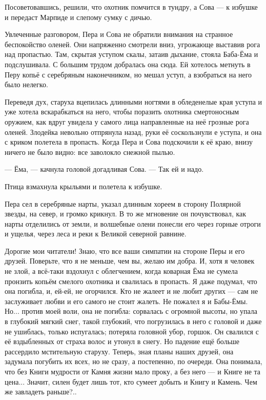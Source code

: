 \documentclass[oneside,final,14pt]{extreport}
\begin{document}
	Посоветовавшись, решили, что охотник помчится в тундру, а Сова — к избушке и передаст Марпиде и слепому сумку с дичью.
	
	Увлеченные разговором, Пера и Сова не обратили внимания на странное беспокойство оленей. Они напряженно смотрели вниз, угрожающе выставив рога над пропастью. Там, скрытая уступом скалы, затаив дыхание, стояла Баба-Ёма и подслушивала. С большим трудом добралась она сюда. Ей хотелось метнуть в Перу копьё с серебряным наконечником, но мешал уступ, а взобраться на него было нелегко.
	
	Переведя дух, старуха вцепилась длинными ногтями в обледенелые края уступа и уже хотела вскарабкаться на него, чтобы поразить охотника смертоносным оружием, как вдруг увидела у самого лица направленные на неё грозные рога оленей. Злодейка невольно отпрянула назад, руки её соскользнули е уступа, и она с криком полетела в пропасть. Когда Пера и Сова подскочили к её краю, внизу ничего не было видно: все заволокло снежной пылью.
	
	— Ёма, — качнула головой догадливая Сова. — Так ей и надо.
	
	Птица взмахнула крыльями и полетела к избушке.
	
	Пера сел в серебряные нарты, указал длинным хореем в сторону Полярной звезды, на север, и громко крикнул. В то же мгновение он почувствовал, как нарты отделились от земли, и волшебные олени понесли его через горные отроги и ущелья, через леса и реки к Великой северной равнине.
	
	Дорогие мои читатели! Знаю, что все ваши симпатии на стороне Перы и его друзей. Поверьте, что я не меньше, чем вы, желаю им добра. И, хотя я человек не злой, а всё-таки вздохнул с облегчением, когда коварная Ёма не сумела пронзить копьём смелого охотника и свалилась в пропасть. Я даже подумал, что она погибла, и, ей-ей, не огорчился. Кто не жалеет и не любит других — сам не заслуживает любви и его самого не стоит жалеть. Не пожалел я и Бабы-Ёмы. Но... против моей воли, она не погибла: сорвалась с огромной высоты, но упала в глубокий мягкий снег, такой глубокий, что погрузилась в него с головой и даже не ушиблась, только испугалась; потеряла головной убор, горшок. Он свалился с её вздыбленных от страха волос и утонул в снегу. Но падение ещё больше рассердило мстительную старуху. Теперь, зная планы наших друзей, она задумала погубить их всех, но не сразу, а постепенно, по очереди. Она понимала, что без Книги мудрости от Камня жизни мало проку, а без него — и Книге не та цена... Значит, силен будет лишь тот, кто сумеет добыть и Книгу и Камень. Чем же завладеть раньше?..
	
\end{document}
